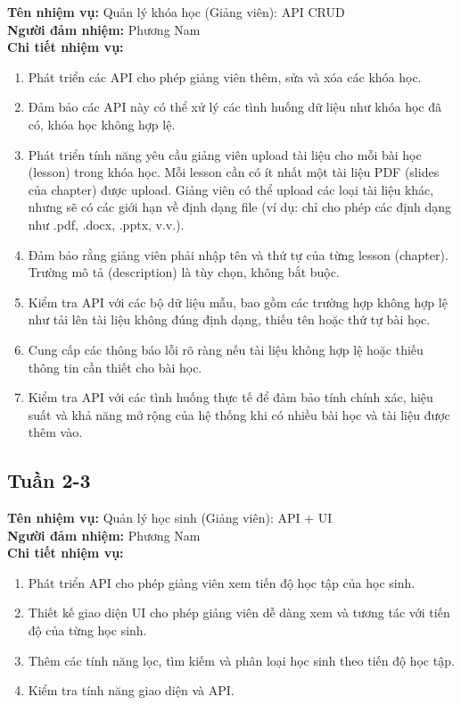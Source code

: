 \noindent \textbf{Tên nhiệm vụ:} Quản lý khóa học (Giảng viên): API CRUD \\
\noindent \textbf{Người đảm nhiệm:} Phương Nam \\
\noindent \textbf{Chi tiết nhiệm vụ:}
\begin{enumerate}[label=-]
    \item Phát triển các API cho phép giảng viên thêm, sửa và xóa các khóa học.
    \item Đảm bảo các API này có thể xử lý các tình huống dữ liệu như khóa học đã có, khóa học không hợp lệ.
    \item Phát triển tính năng yêu cầu giảng viên upload tài liệu cho mỗi bài học (lesson) trong khóa học. Mỗi lesson cần có ít nhất một tài liệu PDF (slides của chapter) được upload. Giảng viên có thể upload các loại tài liệu khác, nhưng sẽ có các giới hạn về định dạng file (ví dụ: chỉ cho phép các định dạng như .pdf, .docx, .pptx, v.v.).
    \item Đảm bảo rằng giảng viên phải nhập tên và thứ tự của từng lesson (chapter). Trường mô tả (description) là tùy chọn, không bắt buộc.
    \item Kiểm tra API với các bộ dữ liệu mẫu, bao gồm các trường hợp không hợp lệ như tải lên tài liệu không đúng định dạng, thiếu tên hoặc thứ tự bài học.
    \item Cung cấp các thông báo lỗi rõ ràng nếu tài liệu không hợp lệ hoặc thiếu thông tin cần thiết cho bài học.
    \item Kiểm tra API với các tình huống thực tế để đảm bảo tính chính xác, hiệu suất và khả năng mở rộng của hệ thống khi có nhiều bài học và tài liệu được thêm vào.
\end{enumerate}


\subsection*{Tuần 2-3}

\noindent \textbf{Tên nhiệm vụ:} Quản lý học sinh (Giảng viên): API + UI \\
\noindent \textbf{Người đảm nhiệm:} Phương Nam \\
\noindent \textbf{Chi tiết nhiệm vụ:} 
\begin{enumerate}[label=-]
    \item Phát triển API cho phép giảng viên xem tiến độ học tập của học sinh. 
    \item Thiết kế giao diện UI cho phép giảng viên dễ dàng xem và tương tác với tiến độ của từng học sinh. 
    \item Thêm các tính năng lọc, tìm kiếm và phân loại học sinh theo tiến độ học tập. 
    \item Kiểm tra tính năng giao diện và API.
\end{enumerate}


